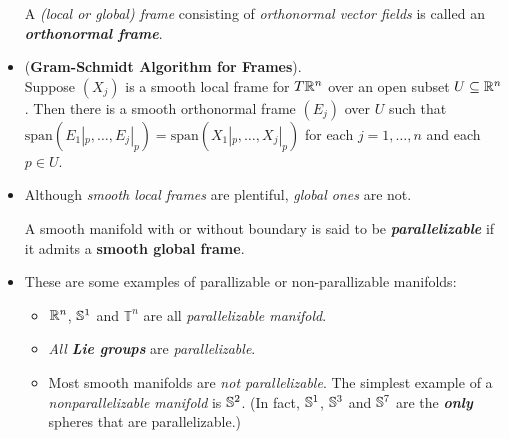 \documentclass[11pt]{article}
\begin{document}
\begin{itemize}
\begin{definition}
A \emph{(local or global) frame} consisting of \emph{orthonormal vector fields} is called an \emph{\textbf{orthonormal frame}}.
\end{definition}

\item \begin{lemma}\label{lemma: gram_schmidt} (\textbf{Gram-Schmidt Algorithm for Frames}). \\
Suppose $(X_j)$ is a smooth local frame for $T {\mathbb R}^n$ over an open subset $U \subseteq {\mathbb R}^n$. Then there is a smooth orthonormal frame $(E_j)$ over $U$ such that $\text{span}(E_1|_{p},\ldots, E_j|_{p}) = \text{span}(X_1|_{p},\ldots, X_j|_{p})$ for each $j = 1,\ldots,n$ and each $p \in U$.
\end{lemma}

\item Although \emph{smooth local frames} are plentiful, \emph{global ones} are not.
\begin{definition}
A smooth manifold with or without boundary is said to be \emph{\textbf{parallelizable}} if it admits a \textbf{smooth global frame}.
\end{definition}

\item 
\begin{example} These are some examples of parallizable or non-parallizable manifolds:
\begin{itemize}
\item ${\mathbb R}^{n}$, ${\mathbb S}^{1}$ and $\mathbb{T}^{n}$ are all \emph{parallelizable manifold}.
\item \emph{All \textbf{Lie groups}} are \emph{parallelizable}.
\item Most smooth manifolds are \emph{not parallelizable}. The simplest example of a \emph{nonparallelizable manifold} is ${\mathbb S}^2$. (In fact, ${\mathbb S}^{1}$, ${\mathbb S}^{3}$ and ${\mathbb S}^{7}$ are the \emph{\textbf{only}} spheres that are parallelizable.)
\end{itemize}
\end{example}
\end{itemize}
\end{document}
